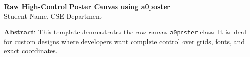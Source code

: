 \documentclass[a0b,portrait]{a0poster}
\begin{document}
\begin{center}
    {\Huge \bfseries Raw High-Control Poster Canvas using a0poster} \\
    \vspace{1cm}
    {\Large Student Name, CSE Department}
\end{center}

\vspace{2cm}
\noindent
{\large \textbf{Abstract:}} This template demonstrates the raw-canvas \texttt{a0poster} class. It is ideal for custom designs where developers want complete control over grids, fonts, and exact coordinates.
\end{document}

